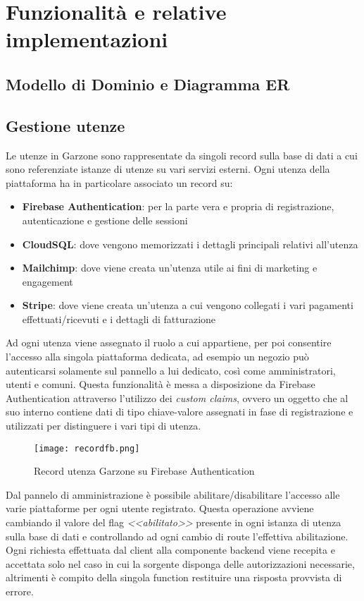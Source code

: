 \chapter{Funzionalità e relative implementazioni}
\section{Modello di Dominio e Diagramma ER}
\section{Gestione utenze}
Le utenze in Garzone sono rappresentate da singoli record sulla base di dati a cui sono referenziate istanze di utenze su vari servizi esterni. Ogni utenza della piattaforma ha in particolare associato un record su:
\begin{itemize}
    \item \textbf{Firebase Authentication}: per la parte vera e propria di registrazione, autenticazione e gestione delle sessioni
    \item \textbf{CloudSQL}: dove vengono memorizzati i dettagli principali relativi all'utenza
    \item \textbf{Mailchimp}: dove viene creata un'utenza utile ai fini di marketing e engagement
    \item \textbf{Stripe}: dove viene creata un'utenza a cui vengono collegati i vari pagamenti effettuati/ricevuti e i dettagli di fatturazione
\end{itemize}
Ad ogni utenza viene assegnato il ruolo a cui appartiene, per poi consentire l'accesso alla singola piattaforma dedicata, ad esempio un negozio può autenticarsi solamente sul pannello a lui dedicato, così come amministratori, utenti e comuni. Questa funzionalità è messa a disposizione da Firebase Authentication attraverso l'utilizzo dei \textit{custom claims}, ovvero un oggetto che al suo interno contiene dati di tipo chiave-valore assegnati in fase di registrazione e utilizzati per distinguere i vari tipi di utenza.
\begin{figure}[h!]
    \centering
    \texttt{[image: recordfb.png]}
    \caption{Record utenza Garzone su Firebase Authentication}
\end{figure}
\FloatBarrier
Dal pannelo di amministrazione è possibile abilitare/disabilitare l'accesso alle varie piattaforme per ogni utente registrato. Questa operazione avviene cambiando il valore del flag \textit{<<abilitato>>} presente in ogni istanza di utenza sulla base di dati e controllando ad ogni cambio di route l'effettiva abilitazione. Ogni richiesta effettuata dal client alla componente backend viene recepita e accettata solo nel caso in cui la sorgente disponga delle autorizzazioni necessarie, altrimenti è compito della singola function restituire una risposta provvista di errore.
